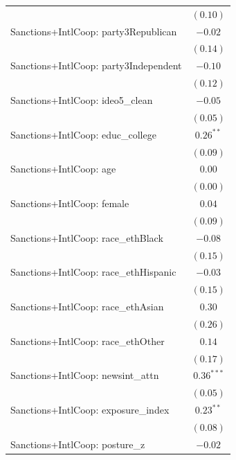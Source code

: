 \begin{tabular}{l c}
                                           & $(0.10)$      \\
Sanctions+IntlCoop: party3Republican       & $-0.02$       \\
                                           & $(0.14)$      \\
Sanctions+IntlCoop: party3Independent      & $-0.10$       \\
                                           & $(0.12)$      \\
Sanctions+IntlCoop: ideo5\_clean           & $-0.05$       \\
                                           & $(0.05)$      \\
Sanctions+IntlCoop: educ\_college          & $0.26^{**}$   \\
                                           & $(0.09)$      \\
Sanctions+IntlCoop: age                    & $0.00$        \\
                                           & $(0.00)$      \\
Sanctions+IntlCoop: female                 & $0.04$        \\
                                           & $(0.09)$      \\
Sanctions+IntlCoop: race\_ethBlack         & $-0.08$       \\
                                           & $(0.15)$      \\
Sanctions+IntlCoop: race\_ethHispanic      & $-0.03$       \\
                                           & $(0.15)$      \\
Sanctions+IntlCoop: race\_ethAsian         & $0.30$        \\
                                           & $(0.26)$      \\
Sanctions+IntlCoop: race\_ethOther         & $0.14$        \\
                                           & $(0.17)$      \\
Sanctions+IntlCoop: newsint\_attn          & $0.36^{***}$  \\
                                           & $(0.05)$      \\
Sanctions+IntlCoop: exposure\_index        & $0.23^{**}$   \\
                                           & $(0.08)$      \\
Sanctions+IntlCoop: posture\_z             & $-0.02$       \\

\end{tabular}
